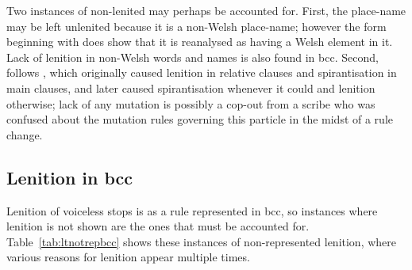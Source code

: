Two instances of non-lenited  may perhaps be accounted for. First, the place-name  may be left unlenited because it is a non-Welsh place-name; however the form beginning with  does show that it is reanalysed as having a Welsh element in it. Lack of lenition in non-Welsh words and names is also found in \gls{bcc}. Second,  follows , which originally caused lenition in relative clauses and spirantisation in main clauses, and later caused spirantisation whenever it could and lenition otherwise; lack of any mutation is possibly a cop-out from a scribe who was confused about the mutation rules governing this particle in the midst of a rule change.

\subsection{Lenition in \acrshort{bcc}}
\label{sec:lenition-acrshortbcc}

Lenition of voiceless stops is as a rule represented in \gls{bcc}, so instances where lenition is not shown are the ones that must be accounted for.
Table~\ref{tab:ltnotrepbcc} shows these instances of non-represented lenition, where various reasons for lenition appear multiple times.

